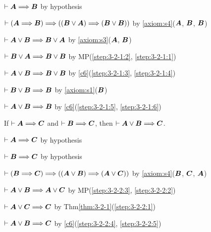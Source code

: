 \begin{pf}
\item\label{step:3-2-1:1} $\vdash\boldsymbol{A}\Longrightarrow\boldsymbol{B}$
  by hypothesis
\item\label{step:3-2-1:2} $\vdash(\boldsymbol{A}\Longrightarrow\boldsymbol{B})\Longrightarrow((\boldsymbol{B}\lor\boldsymbol{A})\Longrightarrow(\boldsymbol{B}\lor\boldsymbol{B}))$
by \ref{axiom:s4}($\boldsymbol{A}$, $\boldsymbol{B}$, $\boldsymbol{B}$)
\item\label{step:3-2-1:3} $\vdash\boldsymbol{A}\lor\boldsymbol{B}\Longrightarrow\boldsymbol{B}\lor\boldsymbol{A}$
by \ref{axiom:s3}($\boldsymbol{A}$, $\boldsymbol{B}$)
\item\label{step:3-2-1:4} $\vdash\boldsymbol{B}\lor\boldsymbol{A}\Longrightarrow\boldsymbol{B}\lor\boldsymbol{B}$
by MP(\ref{step:3-2-1:2}, \ref{step:3-2-1:1})
\item\label{step:3-2-1:5} $\vdash\boldsymbol{A}\lor\boldsymbol{B}\Longrightarrow\boldsymbol{B}\lor\boldsymbol{B}$
by \ref{c6}(\ref{step:3-2-1:3}, \ref{step:3-2-1:4})
\item\label{step:3-2-1:6} $\vdash\boldsymbol{B}\lor\boldsymbol{B}\Longrightarrow\boldsymbol{B}$
  by \ref{axiom:s1}($\boldsymbol{B}$)
\item\label{step:3-2-1:7} $\vdash\boldsymbol{A}\lor\boldsymbol{B}\Longrightarrow\boldsymbol{B}$
  by \ref{c6}(\ref{step:3-2-1:5}, \ref{step:3-2-1:6})
\end{pf}

\begin{theorem}\label{thm:3-2-2}%
If $\vdash\boldsymbol{A}\Longrightarrow\boldsymbol{C}$
and $\vdash\boldsymbol{B}\Longrightarrow\boldsymbol{C}$,
then $\vdash\boldsymbol{A}\lor\boldsymbol{B}\Longrightarrow\boldsymbol{C}$.
\end{theorem}

\begin{pf}
\item\label{step:3-2-2:1} $\vdash\boldsymbol{A}\Longrightarrow\boldsymbol{C}$
  by hypothesis
\item\label{step:3-2-2:2} $\vdash\boldsymbol{B}\Longrightarrow\boldsymbol{C}$
  by hypothesis
\item\label{step:3-2-2:3} $\vdash(\boldsymbol{B}\Longrightarrow\boldsymbol{C})\Longrightarrow((\boldsymbol{A}\lor\boldsymbol{B})\Longrightarrow(\boldsymbol{A}\lor\boldsymbol{C}))$
  by \ref{axiom:s4}($\boldsymbol{B}$, $\boldsymbol{C}$, $\boldsymbol{A}$)
\item\label{step:3-2-2:4} $\vdash\boldsymbol{A}\lor\boldsymbol{B}\Longrightarrow\boldsymbol{A}\lor\boldsymbol{C}$
  by MP(\ref{step:3-2-2:3}, \ref{step:3-2-2:2})
\item\label{step:3-2-2:5} $\vdash\boldsymbol{A}\lor\boldsymbol{C}\Longrightarrow\boldsymbol{C}$
  by Thm\ref{thm:3-2-1}(\ref{step:3-2-2:1})
\item\label{step:3-2-2:6} $\vdash\boldsymbol{A}\lor\boldsymbol{B}\Longrightarrow\boldsymbol{C}$
  by \ref{c6}(\ref{step:3-2-2:4}, \ref{step:3-2-2:5})
\end{pf}
